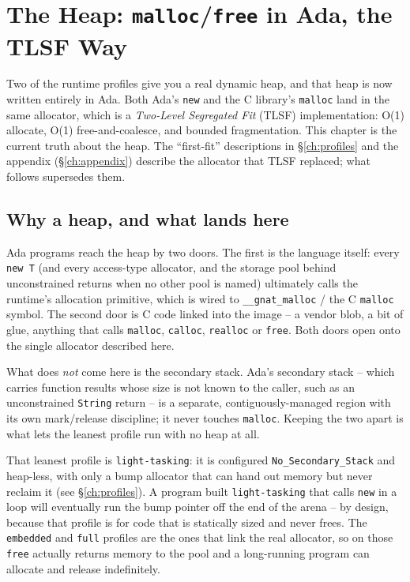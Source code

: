 \chapter{The Heap: \texttt{malloc}/\texttt{free} in Ada, the TLSF Way}
\label{ch:heap}

Two of the runtime profiles give you a real dynamic heap, and that heap is now
written entirely in Ada. Both Ada's \texttt{new} and the C library's
\texttt{malloc} land in the same allocator, which is a \emph{Two-Level
Segregated Fit} (TLSF) implementation: O(1) allocate, O(1) free-and-coalesce,
and bounded fragmentation. This chapter is the current truth about the heap. The
``first-fit'' descriptions in \S\ref{ch:profiles} and the appendix
(\S\ref{ch:appendix}) describe the allocator that TLSF replaced; what follows
supersedes them.

\section{Why a heap, and what lands here}

Ada programs reach the heap by two doors. The first is the language itself: every
\texttt{new T} (and every access-type allocator, and the storage pool behind
unconstrained returns when no other pool is named) ultimately calls the runtime's
allocation primitive, which is wired to \texttt{\_\_gnat\_malloc} / the C
\texttt{malloc} symbol. The second door is C code linked into the image -- a
vendor blob, a bit of glue, anything that calls \texttt{malloc}, \texttt{calloc},
\texttt{realloc} or \texttt{free}. Both doors open onto the single allocator
described here.

What does \emph{not} come here is the secondary stack. Ada's secondary stack --
which carries function results whose size is not known to the caller, such as an
unconstrained \texttt{String} return -- is a separate, contiguously-managed
region with its own mark/release discipline; it never touches \texttt{malloc}.
Keeping the two apart is what lets the leanest profile run with no heap at all.

That leanest profile is \texttt{light-tasking}: it is configured
\texttt{No\_Secondary\_Stack} and heap-less, with only a bump allocator that can
hand out memory but never reclaim it (see \S\ref{ch:profiles}). A program built
\texttt{light-tasking} that calls \texttt{new} in a loop will eventually run the
bump pointer off the end of the arena -- by design, because that profile is for
code that is statically sized and never frees. The \texttt{embedded} and
\texttt{full} profiles are the ones that link the real allocator, so on those
\texttt{free} actually returns memory to the pool and a long-running program can
allocate and release indefinitely.

